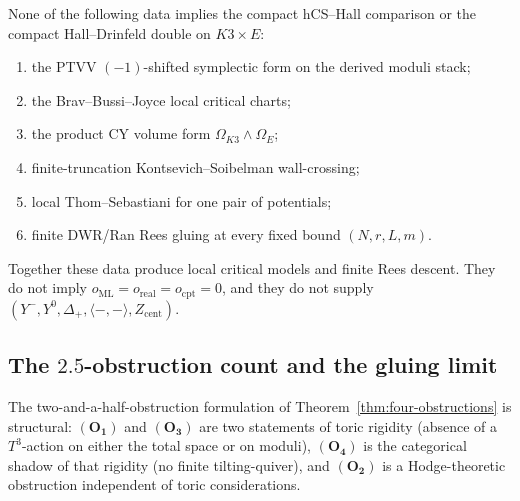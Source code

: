 \begin{corollary}
\label{cor:no-shortcut-compact-hall}
None of the following data implies the compact hCS--Hall comparison or
the compact Hall--Drinfeld double on $K3\times E$:
\begin{enumerate}[label=\emph{(\alph*)}, leftmargin=2.5em]
\item the PTVV $(-1)$-shifted symplectic form on the derived moduli
stack;
\item the Brav--Bussi--Joyce local critical charts;
\item the product CY volume form $\Omega_{K3}\wedge\Omega_E$;
\item finite-truncation Kontsevich--Soibelman wall-crossing;
\item local Thom--Sebastiani for one pair of potentials;
\item finite DWR/Ran Rees gluing at every fixed bound $(N,r,L,m)$.
\end{enumerate}
Together these data produce local critical models and finite Rees
descent. They do not imply
$o_{\mathrm{ML}}=o_{\mathrm{real}}=o_{\mathrm{cpt}}=0$, and they do not
supply $(Y^-,Y^0,\Delta_+,\langle-,-\rangle,Z_{\mathrm{cent}})$.
\end{corollary}
\subsection{The $2.5$-obstruction count and the gluing limit}
\label{sec:limit-gluing}

The two-and-a-half-obstruction formulation of
Theorem~\ref{thm:four-obstructions} is structural: $(\mathbf{O_1})$ and
$(\mathbf{O_3})$ are two statements of toric rigidity (absence of a
$T^3$-action on either the total space or on moduli), $(\mathbf{O_4})$
is the categorical shadow of that rigidity (no finite
tilting-quiver), and $(\mathbf{O_2})$ is a Hodge-theoretic obstruction
independent of toric considerations.

